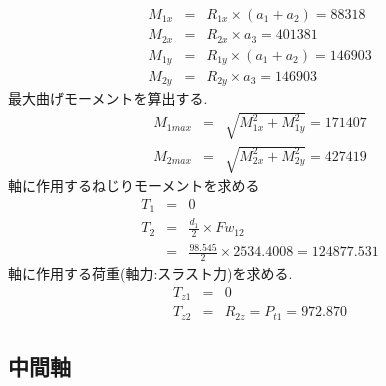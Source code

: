 \begin{eqnarray}
M_{1x} &=& R_{1x} \times (a_1+a_2)=88318\\
M_{2x} &=& R_{2x} \times a_3=401381\\
M_{1y} &=& R_{1y} \times (a_1+a_2)= 146903\\
M_{2y} &=& R_{2y} \times a_3= 146903 
\end{eqnarray}
最大曲げモーメントを算出する.
\begin{eqnarray}
M_{1max} &=& \sqrt {M_{1x}^2+M_{1y}^2}=171407\\
M_{2max} &=& \sqrt {M_{2x}^2+M_{2y}^2}=427419
\end{eqnarray}
軸に作用するねじりモーメントを求める
\begin{eqnarray}
T_{1} &=& 0\\
T_{2} &=& \frac{d_1}{2} \times Fw_{12}\\
      &=& \frac{98.545}{2} \times 2534.4008 = 124877.531
\end{eqnarray}
軸に作用する荷重(軸力:スラスト力)を求める.
\begin{eqnarray}
T_{z1} &=& 0\\
T_{z2} &=& R_{2z} = P_{t1} = 972.870
\end{eqnarray}




\subsection{中間軸}
